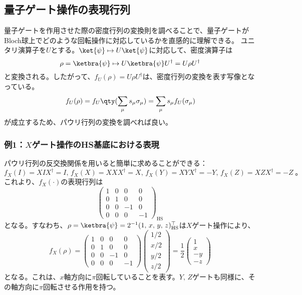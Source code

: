 \documentclass[a4paper,11pt,uplatex]{jsarticle}%
\begin{document}
\newpage
\subsection{量子ゲート操作の表現行列}
量子ゲートを作用させた際の密度行列の変換則を調べることで、量子ゲートがBloch球上でどのような回転操作に対応しているかを直感的に理解できる。
ユニタリ演算子を$U$とする。$\ket{\psi}\mapsto U\ket{\psi}$に対応して、密度演算子は
\begin{equation}
  \rho = \ketbra{\psi}\mapsto U\ketbra{\psi}U^{\dagger} =U\rho U^\dagger
\end{equation}
と変換される。したがって、$f_U(\rho) = U\rho U^{\dagger}$は、密度行列の変換を表す写像となっている。
\begin{equation}
  f_U(\rho) = f_U\qty(\sum_{\mu}s_\mu\sigma_\mu) = \sum_{\mu}s_\mu f_U(\sigma_{\mu})
\end{equation}
が成立するため、パウリ行列の変換を調べれば良い。
\subsubsection*{例1：$X$ゲート操作のHS基底における表現}
パウリ行列の反交換関係を用いると簡単に求めることができる：
\begin{equation}
  f_X(I) = XIX^{\dagger} = I,\,f_X(X) = XXX^{\dagger} = X,\,f_X(Y) = XYX^{\dagger} = -Y,\,f_X(Z) = XZX^{\dagger} = -Z\;。
\end{equation}
これより、$f_X(\cdot)$の表現行列は
\begin{equation}
  \begin{pmatrix}
    1 & 0 & 0 & 0 \\ 0 & 1 & 0 & 0 \\
    0 & 0 & -1 & 0 \\ 0 & 0 & 0 & -1
  \end{pmatrix}_{\text{HS}}
\end{equation}
となる。すなわち、$\rho = \ketbra{\psi} = 2^{-1}(1,\,x,\,y,\,z)_{\text{HS}}^{\top}$は$X$ゲート操作により、
\begin{equation}
  f_X(\rho) = 
  \begin{pmatrix}
    1 & 0 & 0 & 0 \\ 0 & 1 & 0 & 0 \\
    0 & 0 & -1 & 0 \\ 0 & 0 & 0 & -1
  \end{pmatrix}
  \begin{pmatrix}
    1/2 \\ x/2 \\ y/2 \\ z/2
  \end{pmatrix}
  =\frac{1}{2}
  \begin{pmatrix}
    1 \\ x \\ -y \\ -z
  \end{pmatrix}
\end{equation}
となる。これは、$x$軸方向に$\pi$回転していることを表す。$Y,\,Z$ゲートも同様に、その軸方向に$\pi$回転させる作用を持つ。
\end{document}
